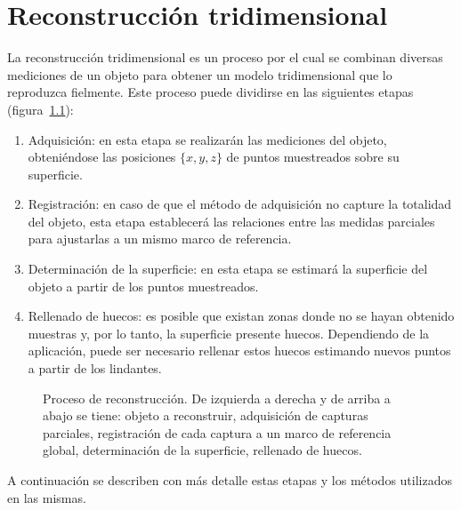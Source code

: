 \chapter{Reconstrucción tridimensional}

La reconstrucción tridimensional es un proceso por el cual se combinan diversas mediciones de un objeto
para obtener un modelo tridimensional que lo reproduzca fielmente.
Este proceso puede dividirse en las siguientes etapas (figura~\ref{fig:proceso_reconstruccion_3d}):
\begin{enumerate}
	\item Adquisición: en esta etapa se realizarán las mediciones del objeto,
		obteniéndose las posiciones $\{x, y, z\}$ de puntos muestreados sobre su superficie.
	\item Registración: en caso de que el método de adquisición no capture la totalidad del objeto,
		esta etapa establecerá las relaciones entre las medidas parciales
		para ajustarlas a un mismo marco de referencia.
	\item Determinación de la superficie: en esta etapa se estimará la superficie del objeto
		a partir de los puntos muestreados.
	\item Rellenado de huecos: es posible que existan zonas donde
		no se hayan obtenido muestras y, por lo tanto, la superficie presente huecos.
		Dependiendo de la aplicación, puede ser necesario rellenar estos huecos
		estimando nuevos puntos a partir de los lindantes.
\end{enumerate}

\begin{figure}
	\caption{\label{fig:proceso_reconstruccion_3d}Proceso de reconstrucción.
	De izquierda a derecha y de arriba a abajo se tiene:
	objeto a reconstruir, adquisición de capturas parciales,
	registración de cada captura a un marco de referencia global,
	determinación de la superficie,
	rellenado de huecos.}
\end{figure}

A continuación se describen con más detalle estas etapas y los métodos utilizados en las mismas.





